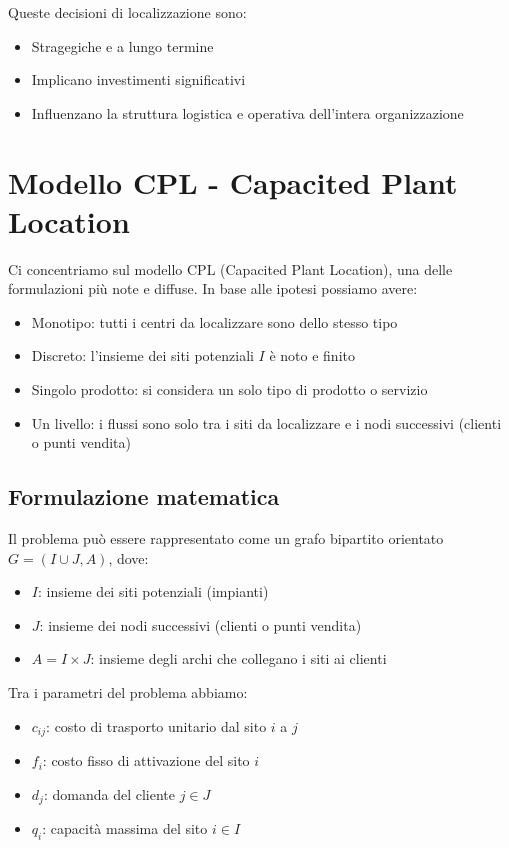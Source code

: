 Queste decisioni di localizzazione sono:
\begin{itemize}
    \item Stragegiche e a lungo termine
    \item Implicano investimenti significativi
    \item Influenzano la struttura logistica e operativa dell'intera organizzazione
\end{itemize}

\section{Modello CPL - Capacited Plant Location}
Ci concentriamo sul modello CPL (Capacited Plant Location), una delle 
formulazioni più note e diffuse. In base alle ipotesi possiamo avere:
\begin{itemize}
    \item Monotipo: tutti i centri da localizzare sono dello stesso tipo
    \item Discreto: l'insieme dei siti potenziali $I$ è noto e finito
    \item Singolo prodotto: si considera un solo tipo di prodotto o servizio
    \item Un livello: i flussi sono solo tra i siti da localizzare e i nodi successivi (clienti o punti vendita)
\end{itemize}

\subsection{Formulazione matematica}
Il problema può essere rappresentato come un grafo bipartito orientato 
$G = (I \cup J, A)$, dove:
\begin{itemize}
    \item $I$: insieme dei siti potenziali (impianti)
    \item $J$: insieme dei nodi successivi (clienti o punti vendita)
    \item $A = I \times J$: insieme degli archi che collegano i siti ai clienti
\end{itemize}

Tra i parametri del problema abbiamo:
\begin{itemize}
    \item $c_{ij}$: costo di trasporto unitario dal sito $i$ a $j$
    \item $f_i$: costo fisso di attivazione del sito $i$
    \item $d_j$: domanda del cliente $j \in J$
    \item $q_i$: capacità massima del sito $i \in I$
\end{itemize}

